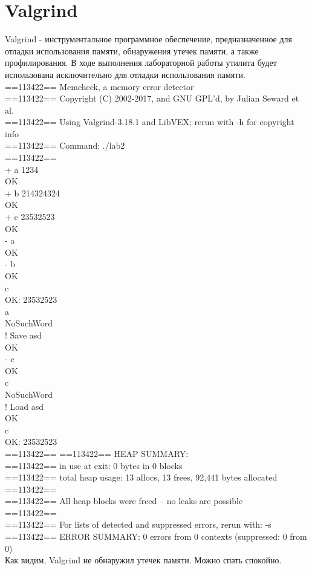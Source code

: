 \documentclass[pdf, unicode, 12pt, a4paper,oneside,fleqn]{article}
\begin{document}
    \section{Valgrind}
    {Valgrind - инструментальное программное обеспечение, предназначенное для отладки использования памяти, обнаружения утечек памяти, а также профилирования. В ходе выполнения лабораторной работы утилита будет использована исключительно для отладки использования памяти. \\
    
    ==113422== Memcheck, a memory error detector \\
    ==113422== Copyright (C) 2002-2017, and GNU GPL'd, by Julian Seward et al. \\
    ==113422== Using Valgrind-3.18.1 and LibVEX; rerun with -h for copyright info \\
    ==113422== Command: ./lab2 \\
    ==113422==  \\
    + a 1234 \\
    OK \\
    + b 214324324 \\
    OK \\
    + c 23532523 \\
    OK \\
    - a \\
    OK \\
    - b \\
    OK \\
    c \\
    OK: 23532523 \\
    a \\
    NoSuchWord  \\
    ! Save asd \\
    OK \\
    - c \\
    OK  \\ 
    c \\
    NoSuchWord \\
    ! Load asd \\
    OK \\
    c \\ 
    OK: 23532523  \\
    ==113422== 
    ==113422== HEAP SUMMARY: \\
    ==113422==     in use at exit: 0 bytes in 0 blocks \\
    ==113422==   total heap usage: 13 allocs, 13 frees, 92,441 bytes allocated \\
    ==113422==  \\
    ==113422== All heap blocks were freed -- no leaks are possible \\ 
    ==113422==  \\
    ==113422== For lists of detected and suppressed errors, rerun with: -s \\
    ==113422== ERROR SUMMARY: 0 errors from 0 contexts (suppressed: 0 from 0) \\
    
    Как видим, Valgrind не обнаружил утечек памяти. Можно спать спокойно.}
    \pagebreak
\end{document}
